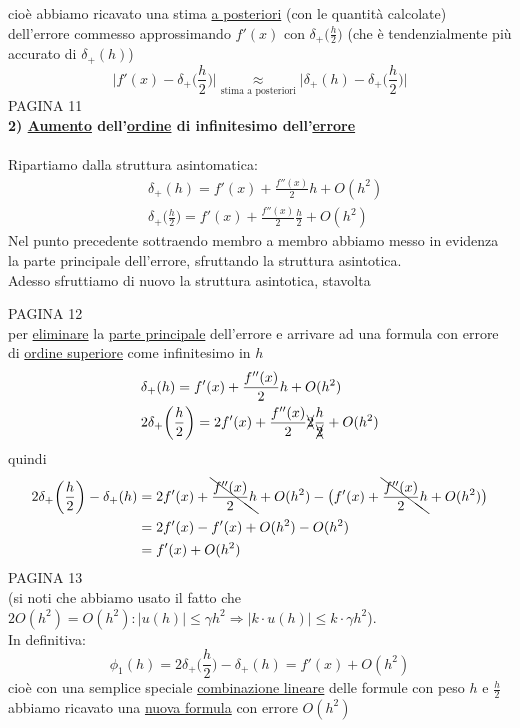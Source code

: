 \documentclass[12pt,a4paper]{article}
\begin{document}
cioè abbiamo ricavato una stima \underline{a posteriori} (con le quantità calcolate) dell'errore commesso approssimando $f'(x)$ con $\delta_+\bigl(\frac{h}{2}\bigr)$ (che è tendenzialmente più accurato di $\delta_+(h)$)
\begin{equation*}
     \biggl|f'(x) - \delta_+\biggl(\frac{h}{2}\biggr) \biggr| \underset{\text{stima a posteriori}}{\approx} \biggl|\delta_+(h) - \delta_+\biggl(\frac{h}{2}\biggr)\biggr|
\end{equation*}
PAGINA 11\\ %
\textbf{2) \underline{Aumento} dell'\underline{ordine} di infinitesimo dell'\underline{errore}}\\
\\
Ripartiamo dalla struttura asintomatica:
\begin{equation*}
    \begin{split}
        & \delta_+(h) = f'(x) + \frac{f''(x)}{2}h + O(h^2) \\
        & \delta_+\biggl(\frac{h}{2}\biggr) = f'(x) + \frac{f''(x)}{2}\frac{h}{2} + O(h^2)
    \end{split}
\end{equation*}
Nel punto precedente sottraendo membro a membro abbiamo messo in evidenza la parte principale dell'errore, sfruttando la struttura asintotica.\\
Adesso sfruttiamo di nuovo la struttura asintotica, stavolta

PAGINA 12\\%
per \underline{eliminare} la \underline{parte principale} dell'errore e arrivare ad una formula con errore di \underline{ordine superiore} come infinitesimo in $h$
\begin{equation*}
    \begin{split}
        & \delta_+(h) = f'(x) + \frac{f''(x)}{2}h + O(h^2) \\
        & 2\delta_+\biggl(\frac{h}{2}\biggr) = 2f'(x) + \frac{f''(x)}{2}\xcancel{2}\frac{h}{\xcancel{2}} + O(h^2)
    \end{split}
\end{equation*}
quindi
\begin{equation*}
    \begin{split}
        2\delta_+ \biggl(\frac{h}{2}\biggr) - \delta_+(h) & = 2f'(x)+\bcancel{\frac{f''(x)}{2}h} + O(h^2) - \bigl(f'(x) + \bcancel{\frac{f''(x)}{2}h} + O(h^2) \bigr) \\
        & = 2f'(x) - f'(x) + O(h^2) - O(h^2) \\
        & = f'(x)+O(h^2)
    \end{split}
\end{equation*}
PAGINA 13 \\%
(si noti che abbiamo usato il fatto che $2O(h^2) = O(h^2) : |u(h)|\leq\gamma h^2 \Rightarrow |k\cdot u(h)|\leq k\cdot\gamma h^2$).\\
In definitiva:
\begin{equation*}
    \phi_1(h) = 2\delta_+ \biggl(\frac{h}{2}\biggr) - \delta_+(h) = f'(x)+O(h^2)
\end{equation*}
cioè con una semplice speciale \underline{combinazione lineare} delle formule con peso $h$ e $\frac{h}{2}$ abbiamo ricavato una \underline{nuova formula} con errore $O(h^2)$
\end{document}
